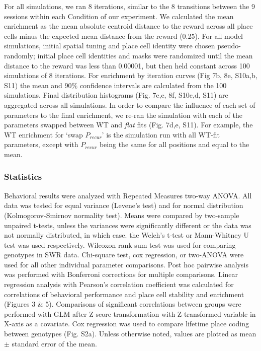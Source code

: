 For all simulations, we ran 8 iterations, similar to the 8 transitions between the 9 sessions within each Condition of our experiment. We calculated the mean enrichment as the mean absolute centroid distance to the reward across all place cells minus the expected mean distance from the reward (0.25). For all model simulations, initial spatial tuning and place cell identity were chosen pseudo-randomly; initial place cell identities and masks were randomized until the mean distance to the reward was less than 0.00001, but then held constant across 100 simulations of 8 iterations. For enrichment by iteration curves (Fig 7b, 8e, S10a,b, S11) the mean and 90$\%$ confidence intervals are calculated from the 100 simulations. Final distribution histograms (Fig. 7c,e, 8f, S10c,d, S11) are aggregated across all simulations. In order to compare the influence of each set of parameters to the final enrichment, we re-ran the simulation with each of the parameters swapped between WT and \emph{flat} fits (Fig. 7d,e, S11). For example, the WT enrichment for `swap $P_{recur}$' is the simulation run with all WT-fit parameters, except with $P_{recur}$ being the same for all positions and equal to the mean.

\subsubsection{Statistics}
Behavioral results were analyzed with Repeated Measures two-way ANOVA. All data was tested for equal variance (Levene's test) and for normal distribution (Kolmogorov-Smirnov normality test). Means were compared by two-sample unpaired t-tests, unless the variances were significantly different or the data was not normally distributed, in which case. the Welch's t-test or Mann-Whitney U test was used respectively. Wilcoxon rank sum test was used for comparing genotypes in SWR data. Chi-square test, cox regression, or two-ANOVA were used for all other individual parameter comparisons. Post hoc pairwise analysis was performed with Bonferroni corrections for multiple comparisons. Linear regression analysis with Pearson's correlation coefficient was calculated for correlations of behavioral performance and place cell stability and enrichment (Figures 3 \& 5). Comparisons of significant correlations between groups were performed with GLM after Z-score transformation with Z-transformed variable in X-axis as a covariate. Cox regression was used to compare lifetime place coding between genotypes (Fig. S2a). Unless otherwise noted, values are plotted as mean $\pm$ standard error of the mean.
